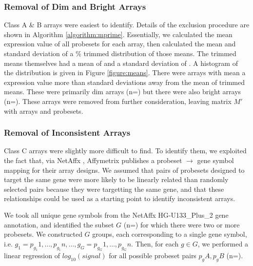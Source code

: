 \documentclass{bioinfo}
\begin{document}
\begin{methods}
\subsubsection{Removal of Dim and Bright Arrays}\label{dimbright}

Class A \& B arrays were easiest to identify.  Details of the exclusion
procedure are shown in Algorithm \ref{algorithm:mprime}.  Essentially, we
calculated the mean expression value of all probesets for each array, then
calculated the mean and standard deviation of a \% trimmed
distribution of those means.  The trimmed means themselves had a mean of
 and a standard deviation of
.  A histogram of the distribution is given in Figure
\ref{figure:means}.  There were  arrays with mean a
expression value more than  standard deviations away
from the mean of trimmed means.  These were primarily dim arrays
(n=) but there were also bright arrays
(n=).  These arrays were removed from further
consideration, leaving matrix $M\prime$ with  arrays and
 probesets.

\subsubsection{Removal of Inconsistent Arrays}\label{inconsistent}

Class C arrays were slightly more difficult to find.  To identify them, we
exploited the fact that, via NetAffx \cite{netaffx}, Affymetrix publishes a
probeset $\rightarrow$ gene symbol mapping for their array designs.  We assumed
that pairs of probesets designed to target the same gene were more likely to be
linearly related than randomly selected pairs because they were targetting the
same gene, and that these relationships could be used as a starting point to
identify inconsistent arrays.

We took all  unique gene symbols from the NetAffx
HG-U133\_Plus\_2 gene annotation, and identified the subset $G$
(n=) for which there were two or more probesets.  We
constructed $G$ groups, each corresponding to a single gene symbol, i.e.
$g_1={p_{g_1}1,\dots,p_{g_1}n},\dots,g_G={p_{g_G}1,\dots,p_{g_G}n}$.  Then, for
each $g{\in}G$, we performed a linear regression of $log_{10}(signal)$ for all
possible probeset pairs $p_gA,p_gB$ (n=).


\end{methods}
\end{document}
